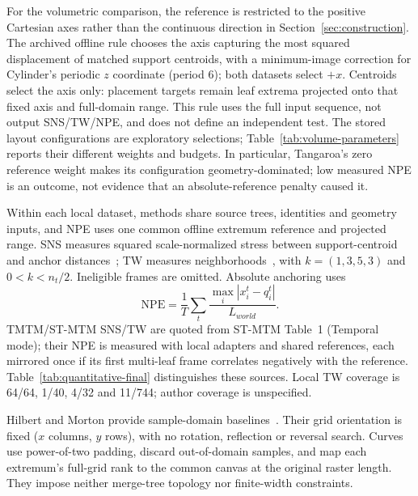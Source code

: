\documentclass{vgtc}                %
\begin{document}
For the volumetric comparison, the reference is restricted to the positive Cartesian axes rather than the continuous direction in Section~\ref{sec:construction}. The archived offline rule chooses the axis capturing the most squared displacement of matched support centroids, with a minimum-image correction for Cylinder's periodic $z$ coordinate (period 6); both datasets select $+x$. Centroids select the axis only: placement targets remain leaf extrema projected onto that fixed axis and full-domain range. This rule uses the full input sequence, not output SNS/TW/NPE, and does not define an independent test. The stored layout configurations are exploratory selections; Table~\ref{tab:volume-parameters} reports their different weights and budgets. In particular, Tangaroa's zero reference weight makes its configuration geometry-dominated; low measured NPE is an outcome, not evidence that an absolute-reference penalty caused it.

Within each local dataset, methods share source trees, identities and geometry inputs, and NPE uses one common offline extremum reference and projected range. SNS measures squared scale-normalized stress between support-centroid and anchor distances~\cite{Smelser:2025:Scale,STMTM:2026}; TW measures neighborhoods~\cite{Venna:2001:NP}, with $k=(1,3,5,3)$ and $0<k<n_t/2$. Ineligible frames are omitted. Absolute anchoring uses
\begin{equation}\label{eq:experimental-npe}
\mathrm{NPE}=\frac{1}{T}\sum_t\frac{\max_i|x_i^t-q_i^t|}{L_{world}}.
\end{equation}
TMTM/ST-MTM SNS/TW are quoted from ST-MTM Table~1 (Temporal mode); their NPE is measured with local adapters and shared references, each mirrored once if its first multi-leaf frame correlates negatively with the reference. Table~\ref{tab:quantitative-final} distinguishes these sources. Local TW coverage is 64/64, 1/40, 4/32 and 11/744; author coverage is unspecified.

Hilbert and Morton provide sample-domain baselines~\cite{Franke:2021:1DP}. Their grid orientation is fixed ($x$ columns, $y$ rows), with no rotation, reflection or reversal search. Curves use power-of-two padding, discard out-of-domain samples, and map each extremum's full-grid rank to the common canvas at the original raster length. They impose neither merge-tree topology nor finite-width constraints.
\end{document}
